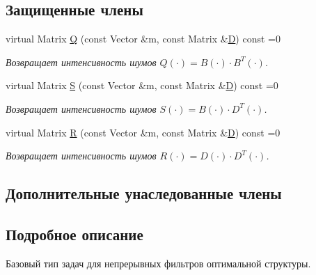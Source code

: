 \subsection*{Защищенные члены}
\begin{DoxyCompactItemize}
\item 
virtual Matrix \hyperlink{class_core_1_1_continuous_task_a8b3712283fb6a46c8c778c9e4f2045e2}{Q} (const Vector \&m, const Matrix \&\hyperlink{class_core_1_1_continuous_task_ac792d0a5d2487a30f9eb360344675173}{D}) const =0\hypertarget{class_core_1_1_continuous_task_a8b3712283fb6a46c8c778c9e4f2045e2}{}\label{class_core_1_1_continuous_task_a8b3712283fb6a46c8c778c9e4f2045e2}

\begin{DoxyCompactList}\small\item\em Возвращает интенсивность шумов $Q(\cdot) = B(\cdot) \cdot B^T(\cdot)$. \end{DoxyCompactList}\item 
virtual Matrix \hyperlink{class_core_1_1_continuous_task_aa6d652b655628586aeeda03348f633c5}{S} (const Vector \&m, const Matrix \&\hyperlink{class_core_1_1_continuous_task_ac792d0a5d2487a30f9eb360344675173}{D}) const =0
\begin{DoxyCompactList}\small\item\em Возвращает интенсивность шумов $S(\cdot) = B(\cdot) \cdot D^T(\cdot)$. \end{DoxyCompactList}\item 
virtual Matrix \hyperlink{class_core_1_1_continuous_task_ad98bb1adf1e394cac3f0bdead365f95a}{R} (const Vector \&m, const Matrix \&\hyperlink{class_core_1_1_continuous_task_ac792d0a5d2487a30f9eb360344675173}{D}) const =0\hypertarget{class_core_1_1_continuous_task_ad98bb1adf1e394cac3f0bdead365f95a}{}\label{class_core_1_1_continuous_task_ad98bb1adf1e394cac3f0bdead365f95a}

\begin{DoxyCompactList}\small\item\em Возвращает интенсивность шумов $R(\cdot) = D(\cdot) \cdot D^T(\cdot)$. \end{DoxyCompactList}\end{DoxyCompactItemize}
\subsection*{Дополнительные унаследованные члены}


\subsection{Подробное описание}
Базовый тип задач для непрерывных фильтров оптимальной структуры. 

